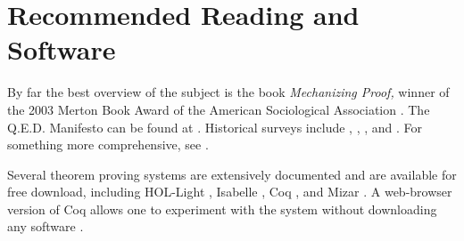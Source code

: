 \documentclass{llncs}
\begin{document}
\section{Recommended Reading and Software}

By far the best overview of the subject is the book {\it Mechanizing Proof,}  winner of the 2003 Merton Book Award of
the American Sociological Association \cite{Mac}.
The Q.E.D. Manifesto can be found at \cite{QED}.
Historical surveys include \cite{Bled},
\cite{Ha07}, \cite{Gor}, and
\cite{Mu}.
For something more comprehensive, see \cite{Ha08}.


Several theorem proving systems are extensively documented and are available for free download,
including HOL-Light \cite{HOLL}, Isabelle \cite{Isa}, Coq \cite{COQ},
and Mizar \cite{Mizar}.  A web-browser version
of Coq allows one to experiment with the system without
downloading any software \cite{PW}.


\end{document}
